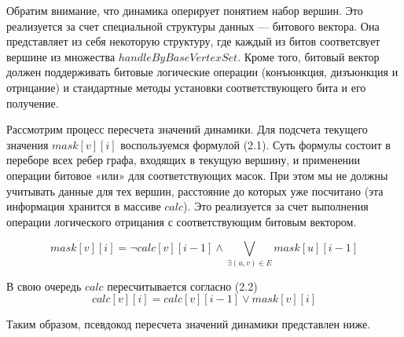  Обратим внимание, что динамика оперирует понятием набор вершин. Это реализуется за счет специальной структуры данных --- битового вектора. Она представляет из себя некоторую структуру, где каждый из битов соответсвует вершине из множества $handleByBaseVertexSet$. Кроме того, битовый вектор должен поддерживать битовые логические операции (конъюнкция, дизъюнкция и отрицание) и стандартные методы установки соответствующего бита и его получение. 
 
 Рассмотрим процесс пересчета значений динамики. Для подсчета текущего значения $mask[v][i]$ воспользуемся формулой (2.1). Суть формулы состоит в переборе всех ребер графа, входящих в текущую вершину, и применении операции битовое «или» для соответствующих масок. При этом мы не должны учитывать данные для тех вершин, расстояние до которых уже посчитано (эта информация хранится в массиве $calc$). Это реализуется за счет выполнения операции логического отрицания с соответствующим битовым вектором.  
  
\FloatBarrier
\begin{equation}
mask[v][i] = \neg calc[v][i - 1] \wedge \bigvee_{\exists (u, v) \in E} mask[u][i - 1] 
\end{equation}
\FloatBarrier

В свою очередь $calc$ пересчитывается согласно (2.2)
\FloatBarrier
\begin{equation}
calc[v][i] = calc[v][i - 1] \vee mask[v][i]
\end{equation}
\FloatBarrier

Таким образом, псевдокод пересчета значений динамики представлен ниже. 


